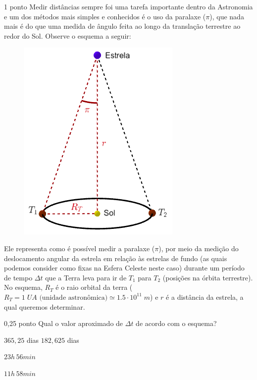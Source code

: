 \documentclass{../lista}
\begin{document}

	\begin{questao}{1 ponto}
		Medir distâncias sempre foi uma tarefa importante dentro da Astronomia e um dos métodos mais simples e conhecidos é o uso da paralaxe ($\pi$), que nada mais é do que uma medida de ângulo feita ao longo da translação terrestre ao redor do Sol. Observe o esquema a seguir:
		\begin{figure}[H]
			\centering
			\includegraphics[scale=0.7]{./img/1.png}
		\end{figure}
		Ele representa como é possível medir a paralaxe ($\pi$), por meio da medição do deslocamento angular da estrela em relação às estrelas de fundo (as quais podemos consider como fixas na Esfera Celeste neste caso) durante um período de tempo $\Delta t$ que a Terra leva para ir de $T_1$ para $T_2$ (posições na órbita terrestre). No esquema, $R_T$ é o raio orbital da terra ($R_T = 1 \; UA \textrm{ (unidade astronômica)} \simeq 1.5 \cdot 10^{11} \; m$) e $r$ é a distância da estrela, a qual queremos determinar.

		\begin{pergunta}{0,25 ponto}
			Qual o valor aproximado de $\Delta t$ de acordo com o esquema?

			\begin{alternativas}
				\item $365,25$ dias
				\alternativaMarcada $182,625$ dias
				\item $23h \, 56min$
				\item $11h \, 58min$
			\end{alternativas}
		\end{pergunta}


\end{questao}
\end{document}
